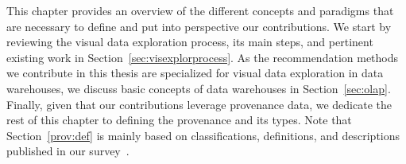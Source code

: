 This chapter provides an overview of the different concepts and paradigms that are necessary to define and put into perspective our contributions. 
We start by reviewing the visual data exploration process, its main steps, and pertinent existing work in Section~\ref{sec:visexplorprocess}.
As the recommendation methods we contribute in this thesis are specialized for visual data exploration in data warehouses, we discuss basic concepts of data warehouses in Section~\ref{sec:olap}.
Finally, given that our contributions leverage provenance data, we dedicate the rest of this chapter to defining the provenance and its types. %
Note that Section~\ref{prov:def} is mainly based on classifications, definitions, and descriptions published in our survey~\cite{Herschel2017survey}.
